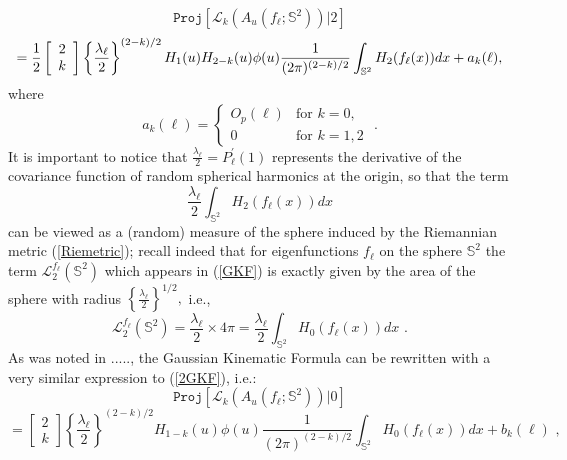 \documentclass[aps,prd,showpacs,superscriptaddress,groupedaddress]{revtex4-1}  %
\begin{document}
\begin{equation*}
\mathtt{Proj}[\mathcal{L}_{k}(A_{u}(f_{\ell };\mathbb{S}^{2}))|2]
\end{equation*}%
\begin{equation}
=\frac{1}{2}\left[ 
\begin{array}{c}
2 \\ 
k%
\end{array}%
\right] \left\{ \frac{\lambda _{\ell }}{2}\right\}
^{(2-k)/2}H_{1}(u)H_{2-k}(u)\phi (u)\frac{1}{(2\pi )^{(2-k)/2}}\int_{\mathbb{%
S}^{2}}H_{2}(f_{\ell }(x))dx+a_{k}(\ell ),  \label{2GKF}
\end{equation}%
where
\begin{equation*}
a_{k}(\ell )=\left\{ 
\begin{array}{cc}
O_{p}(\ell ) & \text{for }k=0, \\ 
0 & \text{for }k=1,2%
\end{array}%
\right. \text{ .}
\end{equation*}%
It is important to notice that $\frac{\lambda _{\ell }}{2}=P_{\ell }^{\prime
}(1)$ represents the derivative of the covariance function of random
spherical harmonics at the origin, so that the term%
\begin{equation*}
\frac{\lambda _{\ell }}{2}\int_{\mathbb{S}^{2}}H_{2}(f_{\ell }(x))dx
\end{equation*}%
can be viewed as a (random) measure of the sphere induced by the Riemannian
metric (\ref{Riemetric}); recall indeed that for eigenfunctions $f_{\ell }$
on the sphere $\mathbb{S}^{2}$ the term ${\mathcal{L}}_{2}^{f_{\ell }}(%
\mathbb{S}^{2})$ which appears in (\ref{GKF}) is exactly given by the area
of the sphere with radius $\left\{ \frac{\lambda _{\ell }}{2}\right\}
^{1/2}, $ i.e., 
\begin{equation*}
{\mathcal{L}}_{2}^{f_{\ell }}(\mathbb{S}^{2})=\frac{\lambda _{\ell }}{2}%
\times 4\pi =\frac{\lambda _{\ell }}{2}\int_{\mathbb{S}^{2}}H_{0}(f_{\ell
}(x))dx\text{ .}
\end{equation*}%
As was noted in ....., the Gaussian Kinematic Formula can be rewritten with a very similar expression to (\ref{2GKF}), i.e.: 
\begin{equation*}
\mathtt{Proj}[\mathcal{L}_{k}(A_{u}(f_{\ell };\mathbb{S}^{2}))|0]
\end{equation*}%
\begin{equation}
=\left[ 
\begin{array}{c}
2 \\ 
k%
\end{array}%
\right] \left\{ \frac{\lambda _{\ell }}{2}\right\} ^{(2-k)/2}H_{1-k}(u)\phi
(u)\frac{1}{(2\pi )^{(2-k)/2}}\int_{\mathbb{S}^{2}}H_{0}(f_{\ell
}(x))dx+b_{k}(\ell )\text{ ,}  \label{1GKF}
\end{equation}%
\end{document}
